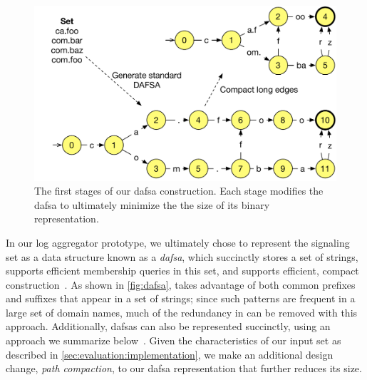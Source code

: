 \begin{figure}
  \centering
  \includegraphics[width=.9\linewidth]{fig/dafsa_combined}
  \vspace{-1mm}
  \caption{The first stages of our \ac{dafsa} construction. 
           Each stage modifies the \ac{dafsa} to ultimately minimize the 
           the size of its binary representation.}
  \vspace{-5mm}
  \label{fig:dafsa}
\end{figure}

In our log aggregator prototype, we ultimately chose to represent the signaling
set as a data structure known as a \emph{\acf{dafsa}}, which succinctly stores a
set of strings, supports efficient membership queries in this set, and supports 
efficient, compact construction~\cite{daciuk2000incremental}. As shown
in \autoref{fig:dafsa},  takes advantage of both common prefixes and
suffixes that appear in a set of strings; since such patterns are frequent in a
large set of domain names, much of the redundancy in \httpsset can be removed with this
approach. Additionally, \acp{dafsa} can also be represented succinctly, using an
approach we summarize below~\cite{daciuk2012smaller}. Given the characteristics
of our input set as described in \autoref{sec:evaluation:implementation}, we
make an additional design change, \emph{path compaction},
to our \ac{dafsa} representation that further reduces its size.

